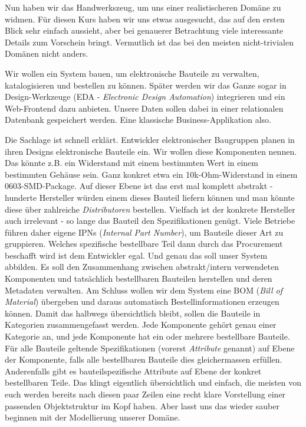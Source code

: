 Nun haben wir das Handwerkszeug, um uns einer realistischeren Domäne
zu widmen. Für diesen Kurs haben wir uns etwas ausgesucht, das auf den ersten 
Blick sehr einfach aussieht, aber bei genauerer Betrachtung viele interessante
Details zum Vorschein bringt. Vermutlich ist das bei den meisten 
nicht-trivialen Domänen nicht anders.

Wir wollen ein System bauen, um elektronische Bauteile zu verwalten, 
katalogisieren und bestellen zu können. Später werden wir das Ganze 
sogar in Design-Werkzeuge (EDA - \textit{Electronic Design Automation})
integrieren und ein Web-Frontend dazu anbieten. Unsere Daten sollen dabei
in einer relationalen Datenbank gespeichert werden. Eine klassische
Business-Applikation also.

Die Sachlage ist schnell erklärt. Entwickler elektronischer Baugruppen
planen in ihren Designs elektronische Bauteile ein. Wir wollen diese
Komponenten nennen. Das könnte z.B. ein Widerstand mit einem bestimmten Wert
in einem bestimmten Gehäuse sein. Ganz konkret etwa ein 10k-Ohm-Widerstand in
einem 0603-SMD-Package. Auf dieser Ebene ist das erst mal komplett abstrakt - 
hunderte Hersteller würden einem dieses Bauteil liefern können und man 
könnte diese über zahlreiche \textit{Distributoren} bestellen. Vielfach
ist der konkrete Hersteller auch irrelevant - so lange das Bauteil den
Spezifikationen genügt. Viele Betriebe führen daher eigene IPNs
(\textit{Internal Part Number}), um Bauteile dieser Art zu gruppieren.
Welches spezifische bestellbare Teil dann durch das Procurement beschafft wird
ist dem Entwickler egal. Und genau das soll unser System abbilden.
Es soll den Zusammenhang zwischen abstrakt/intern verwendeten Komponenten und
tatsächlich bestellbaren Bauteilen herstellen und deren Metadaten verwalten.
Am Schluss wollen wir dem System eine BOM (\textit{Bill of Material}) übergeben
und daraus automatisch Bestellinformationen erzeugen können. Damit das 
halbwegs übersichtlich bleibt, sollen die Bauteile in Kategorien zusammengefasst
werden. Jede Komponente gehört genau einer Kategorie an, und jede Komponente hat
ein oder mehrere bestellbare Bauteile. Für alle Bauteile geltende 
Spezifikationen (vorerst \textit{Attribute} genannt) auf Ebene der Komponente,
falls alle bestellbaren Bauteile dies gleichermassen erfüllen. Anderenfalls gibt 
es bauteilspezifische Attribute auf Ebene der konkret bestellbaren Teile.
Das klingt eigentlich übersichtlich und einfach, die meisten von euch werden
bereits nach diesen paar Zeilen eine recht klare Vorstellung einer passenden
Objektstruktur im Kopf haben. Aber lasst uns das wieder sauber beginnen
mit der Modellierung unserer Domäne.



